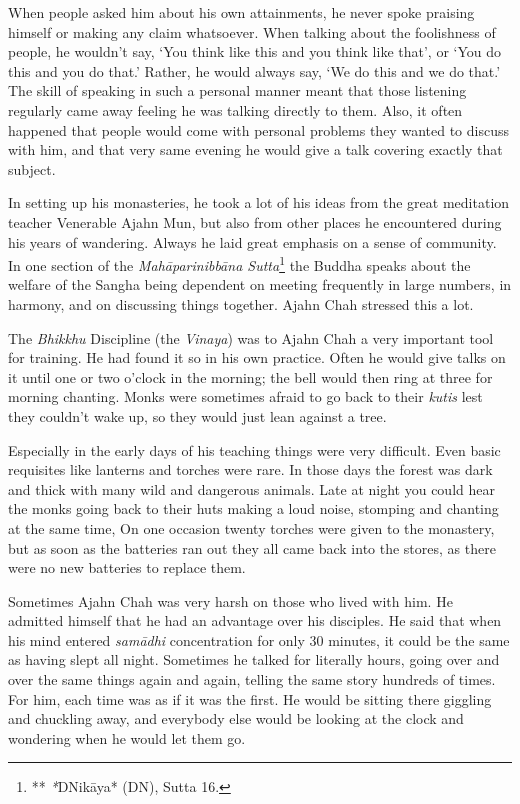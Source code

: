 When people asked him about his own attainments, he never spoke praising
himself or making any claim whatsoever. When talking about the
foolishness of people, he wouldn't say, `You think like this and you
think like that', or `You do this and you do that.' Rather, he would
always say, `We do this and we do that.' The skill of speaking in such a
personal manner meant that those listening regularly came away feeling
he was talking directly to them. Also, it often happened that people
would come with personal problems they wanted to discuss with him, and
that very same evening he would give a talk covering exactly that
subject.

In setting up his monasteries, he took a lot of his ideas from the great
meditation teacher Venerable Ajahn Mun, but also from other places he
encountered during his years of wandering. Always he laid great emphasis
on a sense of community. In one section of the \emph{Mahāparinibbāna
Sutta}\footnote{** \emph{*}DNikāya* (DN), Sutta 16.} the Buddha speaks
about the welfare of the Sangha being dependent on meeting frequently in
large numbers, in harmony, and on discussing things together. Ajahn Chah
stressed this a lot.

The \emph{Bhikkhu} Discipline (the \emph{Vinaya}) was to Ajahn Chah a
very important tool for training. He had found it so in his own
practice. Often he would give talks on it until one or two o'clock in
the morning; the bell would then ring at three for morning chanting.
Monks were sometimes afraid to go back to their \emph{kutis} lest they
couldn't wake up, so they would just lean against a tree.

Especially in the early days of his teaching things were very difficult.
Even basic requisites like lanterns and torches were rare. In those days
the forest was dark and thick with many wild and dangerous animals. Late
at night you could hear the monks going back to their huts making a loud
noise, stomping and chanting at the same time, On one occasion twenty
torches were given to the monastery, but as soon as the batteries ran
out they all came back into the stores, as there were no new batteries
to replace them.

Sometimes Ajahn Chah was very harsh on those who lived with him. He
admitted himself that he had an advantage over his disciples. He said
that when his mind entered \emph{samādhi} concentration for only 30
minutes, it could be the same as having slept all night. Sometimes he
talked for literally hours, going over and over the same things again
and again, telling the same story hundreds of times. For him, each time
was as if it was the first. He would be sitting there giggling and
chuckling away, and everybody else would be looking at the clock and
wondering when he would let them go.

